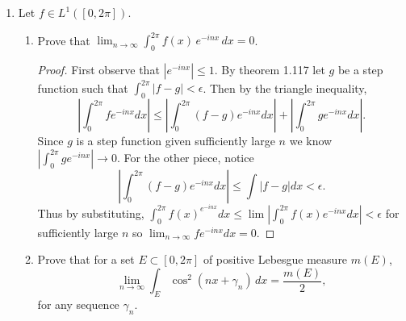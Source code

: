 \documentclass[12pt]{article}
\begin{document}
\begin{enumerate}
\begin{enumerate}[label=(\roman*)]
		            \begin{proof}
			            Let $0<\epsilon<1$ and let $O_k = (r_k- \frac{\epsilon}{2^{k+2}}, r_k + \frac{\epsilon}{2^{k+2}})$.
			            Observe that given $U = \cup_{k\in \mathbb{N}}O_k$, $m(U)\leq \sum_{k\in \mathbb{N}}m(O_k) = \frac{\epsilon}{2}$ by subadditivity.
			            Define $K_\epsilon = [0,1]\backslash U$ and observe that $m(K_\epsilon)\geq 1-\frac{\epsilon}{2} \geq 1 - \epsilon.$ Then for all $x \in K_\epsilon$, $|x-r_k| \geq \frac{\epsilon}{2^{k+1}}$ since
			            $x\notin U$. Let $f_N(x) = \sum_{k=1}^N 2^{-k}g(x-r_k)$ and see
			            $$sup|f(x) - f_N(x)| \leq \sum_{k=N+1}^\infty 2^{-k} (\frac{\epsilon}{2^{k+2}})^{-1/3} = \frac{2^{2/3}}{\epsilon^{1/3}}\sum_{k=N+1}^\infty 2^{-2k/3}\to 0$$
			            by ratio test of geometric series. Thus $f$ is uniformly continuous on $K_\epsilon$.

		            \end{proof}
	      \end{enumerate}

	\item Let $f \in L^1([0, 2\pi])$.

	      \begin{enumerate}[label=(\roman*)]
		      \item Prove that $\displaystyle\lim_{n\to\infty} \int_0^{2\pi} f(x)\,e^{-inx}\,dx = 0$.

		            \begin{proof}
			            First observe that $|e^{-inx}| \leq 1$. By theorem 1.117 let $g$ be a step function such that $\int_0^{2\pi} |f - g| < \epsilon$. Then by the triangle inequality,
			            $$|\int_0^{2\pi} f e^{-inx}dx| \leq |\int_0^{2\pi} (f-g)e^{-inx}dx| + |\int_0^{2\pi} ge^{-inx}dx|.$$
			            Since $g$ is a step function given sufficiently large $n$ we know $|\int_0^{2\pi}ge^{-inx}|\to 0$. For the other piece, notice
			            $$|\int_0^{2\pi} (f-g)e^{-inx}dx| \leq \int |f-g|dx < \epsilon.$$
			            Thus by substituting, $\int_0^{2\pi}f(x)^e^{-inx}dx \leq \lim|\int_0^{2\pi}f(x)e^{-inx}dx| < \epsilon$ for sufficiently large $n$ so $\lim_{n\to\infty}fe^{-inx}dx = 0$.
		            \end{proof}

		      \item Prove that for a set $E \subset [0, 2\pi]$ of positive Lebesgue measure $m(E)$,
		            \[
			            \lim_{n\to\infty} \int_E \cos^2(nx + \gamma_n)\,dx = \frac{m(E)}{2},
		            \]
		            for any sequence $\gamma_n$.


\end{enumerate}
\end{enumerate}
\end{document}

